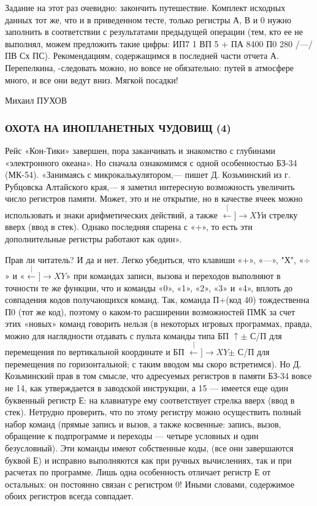 \documentclass[11pt,a4paper,oneside]{article}
\def\XY{$\stackrel[\leftarrow]{\rightarrow}{XY}$}
\begin{document}
Задание на этот раз очевидно: закончить путешествие. Комплект исходных данных тот же, что и в приведенном тесте, только регистры А, В и 0 нужно заполнить в соответствии с результатами предыдущей операции (тем, кто ее не выполнял, можем предложить такие цифры: ИП7 1 ВП 5 + ПА 8400 П0 280 /—/ ПВ Сх ПС). Рекомендациям, содержащимся в последней части отчета А. Перепелкина, -следовать можно, но вовсе не обязательно: путей в атмосфере много, и все они ведут вниз. Мягкой посадки!

Михаил ПУХОВ

\subsubsection{ОХОТА НА ИНОПЛАНЕТНЫХ ЧУДОВИЩ (4)}
Рейс «Кон-Тики» завершен, пора заканчивать и знакомство с глубинами «электронного океана». Но сначала ознакомимся с одной особенностью БЗ-34 (МК-54). «Занимаясь с микрокалькулятором,— пишет Д. Козьминский из г. Рубцовска Алтайского края,— я заметил интересную возможность увеличить число регистров памяти. Может, это и не открытие, но в качестве ячеек можно использовать и знаки арифметических действий, а также \XY и стрелку вверх (ввод в стек). Однако последняя спарена с «+», то есть эти дополнительные регистры работают как один».

Прав ли читатель? И да и нет. Легко убедиться, что клавиши «+»,	«—», "Х", «$\div$» и «\XY» при командах записи, вызова и переходов выполняют в точности те же функции, что и команды «0», «1», «2», «3» и «4», вплоть до совпадения кодов получающихся команд. Так, команда П+(код 40) тождественна П0 (тот же код), поэтому о каком-то расширении возможностей ПМК за счет этих «новых» команд говорить нельзя (в некоторых игровых программах, правда, можно для наглядности отдавать с пульта команды типа БП $\uparrow \pm$ С/П для перемещения по вертикальной координате и БП \XY $\pm$ С/П для перемещения по горизонтальной; с таким вводом мы скоро встретимся). Но Д. Козьминский прав в том смысле, что адресуемых регистров в памяти БЗ-34 вовсе не 14, как утверждается в заводской инструкции, а 15 — имеется еще один буквенный регистр Е: на клавиатуре ему соответствует стрелка вверх (ввод в стек). Нетрудно проверить, что по этому регистру можно осуществить полный набор команд (прямые запись и вызов, а также косвенные: запись, вызов, обращение к подпрограмме и переходы — четыре условных и один безусловный). Эти команды имеют собственные коды, (все они завершаются буквой Е) и исправно выполняются как при ручных вычислениях, так и при расчетах по программе. Лишь одна особенность отличает регистр Е от остальных: он постоянно связан с регистром 0! Иными словами, содержимое обоих регистров всегда совпадает.
\end{document}

